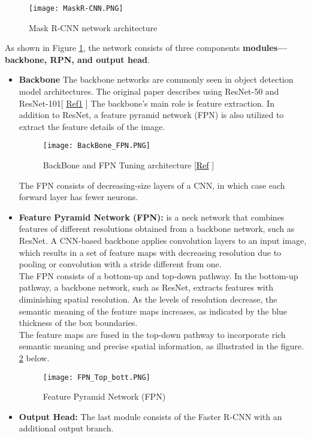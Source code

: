 \begin{figure}[H]
    \centering
    \texttt{[image: MaskR-CNN.PNG]}
    \caption{Mask R-CNN network architecture \cite{he2017mask}}
    \label{fig:MaskR-CNN}
\end{figure}
As shown in Figure \ref{fig:MaskR-CNN}, the network consists of three components \textbf{modules—backbone, RPN, and output head}.
\begin{itemize}
    \item \textbf{Backbone} The backbone networks are commonly seen in object detection model architectures. The original paper describes using ResNet-50 and ResNet-101[ \textcolor{red}{\href{https://arxiv.org/pdf/1612.03144.pdf}{Ref1}} ]
    The backbone’s main role is feature extraction.
    In addition to ResNet, a feature pyramid network (FPN) is also utilized to extract the feature details of the image.
    \begin{figure}[H]
        \centering\texttt{[image: BackBone\_FPN.PNG]}
        \caption{BackBone and FPN Tuning architecture \protect\href{https://medium.com/@freshtechyy/fusing-backbone-features-using-feature-pyramid-network-fpn-c652aa6a264b}{[\textcolor{black}{Ref}} ]}\cite{zhu2022improved} 
    \end{figure}
The FPN consists of decreasing-size layers of a CNN, in which case each forward layer has fewer neurons.

        \item \textbf{Feature Pyramid Network (FPN): } is a neck network that combines features of different resolutions obtained from a backbone network, such as ResNet. A CNN-based backbone applies convolution layers to an input image, which results in a set of feature maps with decreasing resolution due to pooling or convolution with a stride different from one.\\
        The FPN consists of a bottom-up and top-down pathway. In the bottom-up pathway, a backbone network, such as ResNet, extracts features with diminishing spatial resolution.
        As the levels of resolution decrease, the semantic meaning of the feature maps increases, as indicated by the blue thickness of the box boundaries.\\
        The feature maps are fused in the top-down pathway to incorporate rich semantic meaning and precise spatial information, as illustrated in the figure. \ref{fig:FPN_Arch} below. \cite{lin2017feature}
        \begin{figure}[H]
            \centering
            \texttt{[image: FPN\_Top\_bott.PNG]}
            \caption{Feature Pyramid Network (FPN) \cite{lin2017feature}}
            \label{fig:FPN_Arch}
        \end{figure}
         \item \textbf{Output Head: } The last module consists of the Faster R-CNN with an additional output branch. \cite{he2017mask}
\end{itemize}
   
